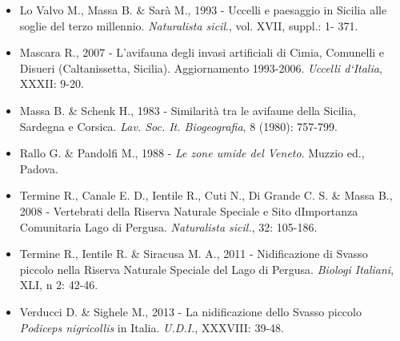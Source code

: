 \begin{itemize}
 \item {Lo Valvo M., Massa B. \& Sar\`a M., 1993 - Uccelli e
paesaggio in Sicilia alle soglie del terzo millennio.
}\textit{{Naturalista sicil}}{., vol.
XVII, suppl.: 1- 371.}

 \item {Mascara R., 2007 - L{\textquoteright}avifauna degli
invasi artificiali di Cimia, Comunelli e Disueri (Caltanissetta,
Sicilia). Aggiornamento 1993-2006. }\textit{{Uccelli
d{\textquoteleft}Italia}}{, XXXII: 9-20.}

 \item {Massa B. \& Schenk H., 1983 - Similarit\`a tra le
avifaune della Sicilia, Sardegna e Corsica.
}\textit{{Lav. Soc. It.
Biogeografia}}{, 8 (1980): 757-799.}

 \item {Rallo G. \& Pandolfi M., 1988 -
}\textit{{Le zone umide del
Veneto}}{. Muzzio ed., Padova.}

 \item {Termine R., Canale E. D., Ientile R., Cuti N., Di
Grande C. S. \& Massa B., 2008 - Vertebrati della Riserva Naturale
Speciale e Sito d{\textquotesingle}Importanza Comunitaria Lago di
Pergusa. }\textit{{Naturalista
sicil.}}{, 32: 105-186.}

 \item {Termine R., Ientile R. \& Siracusa M. A., 2011 -
Nidificazione di Svasso piccolo nella Riserva Naturale Speciale del
Lago di Pergusa. }\textit{{Biologi
Italiani}}{, XLI, n{\textdegree} 2: 42-46.}

 \item {Verducci D. \& Sighele M., 2013 - La nidificazione
dello Svasso piccolo }\textit{{Podiceps
nigricollis}}{ in Italia.
}\textit{{U.D.I.}}{, XXXVIII: 39-48.}
\end{itemize}
